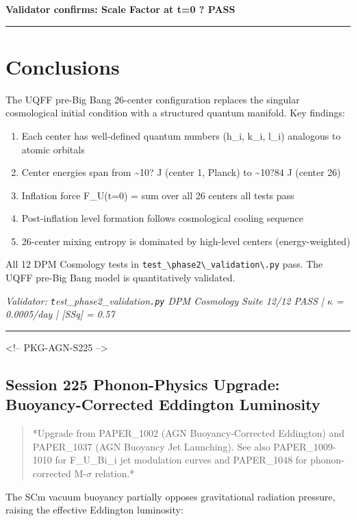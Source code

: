 \documentclass[12pt,a4paper]{article}
\begin{document}
\textbf{Validator confirms: Scale Factor at t=0 ? PASS}

\medskip\hrule\medskip

\section{Conclusions}

The UQFF pre-Big Bang 26-center configuration replaces the singular cosmological initial condition with a structured quantum manifold. Key findings:

\begin{enumerate}
  \item Each center has well-defined quantum numbers (h\_i, k\_i, l\_i) analogous to atomic orbitals
  \item Center energies span from \textasciitilde{}10? J (center 1, Planck) to \textasciitilde{}10?84 J (center 26)
  \item Inflation force F\_U(t=0) = sum over all 26 centers  all tests pass
  \item Post-inflation level formation follows cosmological cooling sequence
  \item 26-center mixing entropy is dominated by high-level centers (energy-weighted)
\end{enumerate}

All 12 DPM Cosmology tests in \texttt{test\_\textbackslash {phase2\textbackslash \_validation\textbackslash }.py} pass. The UQFF pre-Big Bang model is quantitatively validated.

\emph{Validator: \texttt{t}est\_{phase2\_validation}\texttt{.py} DPM Cosmology Suite 12/12 PASS | $\kappa$ = 0.0005/day | [SSq] = 0.57}

\medskip\hrule\medskip

<!-- PKG-AGN-S225 -->

\subsection{Session 225 Phonon-Physics Upgrade: Buoyancy-Corrected Eddington Luminosity}

\begin{quote}
*Upgrade from PAPER\_1002 (AGN Buoyancy-Corrected Eddington) and PAPER\_1037
(AGN Buoyancy Jet Launching).  See also PAPER\_1009-1010 for F\_{U\_Bi\_i} jet
modulation curves and PAPER\_1048 for phonon-corrected M-$\sigma$ relation.*
\end{quote}

The SCm vacuum buoyancy partially opposes gravitational radiation pressure, raising the effective Eddington luminosity:
\end{document}
